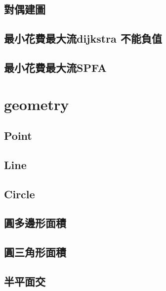 \documentclass[a4paper,10pt,twocolumn,oneside]{article}
\begin{document}
    \subsection{對偶建圖}
    

    \subsection{最小花費最大流dijkstra 不能負值}
    

    \subsection{最小花費最大流SPFA}
    

\section{geometry}
    \subsection{Point}
    

    \subsection{Line}
    

    \subsection{Circle}
    

    \subsection{圓多邊形面積}
    

    \subsection{圓三角形面積}
    

    \subsection{半平面交}
    
\end{document}
